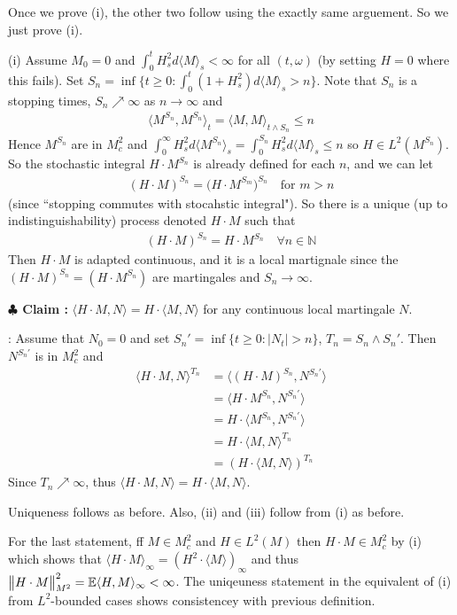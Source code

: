 \documentclass[12pt,a4paper]{article}
\newenvironment{proof}
{\begin{changemargin}{0.5cm}{0.5cm} 
	}%
	{\end{changemargin}
}
\newenvironment{subproof}
{\begin{changemargin}{0.5cm}{0.5cm} 
	}%
	{\end{changemargin}
}
\newenvironment{p}
{\begin{proof} 
	}%
	{\end{proof}
}
\begin{document}
\begin{p}
\pf Once we prove (i), the other two follow using the exactly same arguement. So we just prove (i).

(i) Assume $M_0 =0$ and  $\int_0^t H_s^2 d\langle M \rangle_s < \infty$ for all $(t, \omega)$ (by setting $H=0$ where this fails). Set $S_n = \inf\{t\geq 0 : \int_0^t (1+H_s^2) d\langle M \rangle_s > n\}$. Note that $S_n$ is a stopping times, $S_n \nearrow \infty$ as $n\rightarrow \infty$ and
\begin{align*}
\langle M^{S_n}, M^{S_n} \rangle_t = \langle M, M \rangle_{t\wedge S_n} \leq n
\end{align*}
Hence $M^{S_n}$ are in $M^2_c$ and $\int_0^{\infty} H_s^2 d\langle M^{S_n} \rangle_s =\int_0^{S_n} H_s^2 d\langle M \rangle_s \leq n$ so $H\in L^2(M^{S_n})$. So the stochastic integral $H\cdot M^{S_n}$ is already defined for each $n$, and we can let
\begin{align*}
(H\cdot M)^{S_n} = \big( H \cdot M^{S_m} \big)^{S_n} \quad \text{for } m>n
\end{align*}
(since ``stopping commutes with stocahstic integral"). So there is a unique (up to indistinguishability) process denoted $H\cdot M$ such that
\begin{align*}
(H\cdot M)^{S_n} = H \cdot M^{S_n} \quad \forall n\in \mathbb{N}
\end{align*}
Then $H\cdot M$ is adapted continuous, and it is a local martignale since the $(H\cdot M)^{S_n} = (H\cdot M^{S_n})$ are martingales and $S_n \rightarrow \infty$.

\textbf{$\clubsuit$ Claim :} $\langle H\cdot M , N \rangle = H \cdot \langle M, N \rangle$ for any continuous local martingale $N$.
\begin{subproof}
: Assume that $N_0 =0$ and set $S_n' = \inf \{t\geq 0 : |N_t| >n \}$, $T_n = S_n \wedge S_n'$. Then $N^{S_n'}$ is in $M_c^2$ and 
\begin{align*}
\langle H\cdot M, N \rangle^{T_n} &= \langle (H\cdot M)^{S_n}, N^{S_n'}\rangle \\
&=\langle H \cdot M^{S_n}, N^{S_n'} \rangle \\
&= H \cdot \langle M^{S_n} , N^{S_n'} \rangle \\
&= H\cdot \langle M, N \rangle^{T_n} \\
&= (H\cdot \langle M, N \rangle)^{T_n}
\end{align*}
Since $T_n \nearrow \infty$, thus $\langle H \cdot M, N \rangle = H \cdot \langle M, N \rangle$.
\end{subproof}
Uniqueness follows as before. Also, (ii) and (iii) follow from (i) as before.
\s

For the last statement, ff $M\in M_c^2$ and $H\in L^2(M)$ then $H\cdot M \in M_c^2$ by (i) which shows that $\langle H\cdot M \rangle_{\infty} = (H^2 \cdot \langle M \rangle)_{\infty}$ and thus $\bigl\lVert H\cdot M\bigr\rVert_{M^2}^2 = \mathbb{E}\langle H, M \rangle_{\infty} < \infty$. The uniqeuness statement in the equivalent of (i) from $L^2$-bounded cases shows consistencey with previous definition.
\eop 
\end{p}
\end{document}
